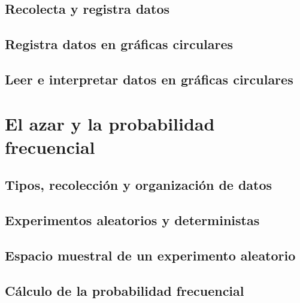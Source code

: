 \documentclass[11pt]{book}
\begin{document}
\subsection{Recolecta y registra datos}
\subsection{Registra datos en gráficas circulares}
\subsection{Leer e interpretar datos en gráficas circulares}

\newpage
\section{El azar y la probabilidad frecuencial}
\subsection{Tipos, recolección y organización de datos}
\subsection{Experimentos aleatorios y deterministas}
\subsection{Espacio muestral de un experimento aleatorio}
\subsection{Cálculo de la probabilidad frecuencial}
\end{document}
